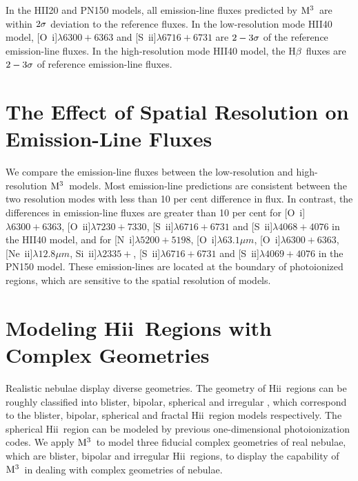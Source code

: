 \documentclass[twocolumn]{aastex62}
\newcommand{\hb}{H$\beta$}    %
\newcommand{\newcode}{{$\rm M^3$}}
\newcommand{\hiireg}{{H{\sc ii}}}
\begin{document}
\begin{CJK*}{UTF8}{gbsn}
In the HII20 and PN150 models, all emission-line fluxes predicted by \newcode\ are within $\rm 2\sigma$ deviation to the reference fluxes.
In the low-resolution mode HII40 model, {[O~\sc i]}$\lambda6300+6363$ and {[S~\sc ii]}$\lambda6716+6731$ are $\rm 2-3\sigma$ of the reference emission-line fluxes. 
In the high-resolution mode HII40 model, the \hb\ fluxes are $\rm 2-3\sigma$ of reference emission-line fluxes. 


\section{The Effect of Spatial Resolution on Emission-Line Fluxes}

We compare the emission-line fluxes between the low-resolution and high-resolution \newcode\ models.
Most emission-line predictions are consistent between the two resolution modes with less than 10 per cent difference in flux. 
In contrast, the differences in emission-line fluxes are greater than 10 per cent for  {[O~\sc i]}$\lambda6300+6363$, {[O~\sc ii]}$\lambda7230+7330$, {[S~\sc ii]}$\lambda6716+6731$ and {[S~\sc ii]}$\lambda4068+4076$ in the HII40 model, and for {[N~\sc i]}$\lambda5200+5198$, {[O~\sc i]}$\lambda63.1\mu m$, {[O~\sc i]}$\lambda6300+6363$, {[Ne~\sc ii]}$\lambda12.8\mu m$, {Si~\sc ii]}$\lambda2335+$, {[S~\sc ii]}$\lambda6716+6731$ and {[S~\sc ii]}$\lambda4069+4076$ in the PN150 model.
These emission-lines are located at the boundary of photoionized regions, which are sensitive to the spatial resolution of models. 



\section{Modeling \hiireg\ Regions with Complex Geometries}\label{sec:models} 
 

Realistic nebulae display diverse geometries.
The geometry of \hiireg\ regions can be roughly classified into blister, bipolar, spherical and irregular \citep{DePree-2005,Deharveng-2015}, which correspond to the blister, bipolar, spherical and fractal \hiireg\ region models respectively.
The spherical \hiireg\ region can be modeled by previous one-dimensional photoionization codes.
We apply \newcode\ to model three fiducial complex geometries of real nebulae, which are blister, bipolar and irregular \hiireg\ regions, to display the capability of \newcode\ in dealing with complex geometries of nebulae.



\end{CJK*}
\end{document}
